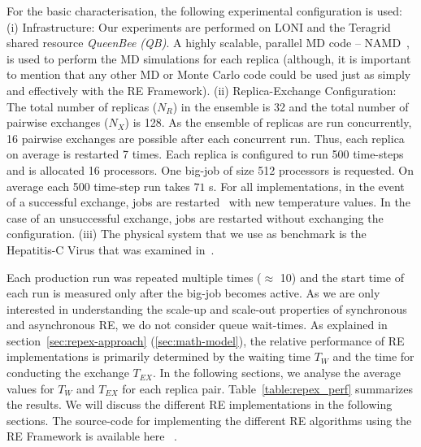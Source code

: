 \documentclass{rspublic}
\newcommand{\jhanote}[1]{ {\textcolor{red} { ***shantenu: #1 }}}
\newcommand{\alnote}[1]{ {\textcolor{blue} { ***andre: #1 }}}
\newcommand{\athotanote}[1]{ {\textcolor{green} { ***athota: #1 }}}
\newcommand{\alnote}[1]{}
\newcommand{\athotanote}[1]{}
\newcommand{\jhanote}[1]{}
\begin{document}
For the basic characterisation, the following experimental
configuration is used: (i) Infrastructure: Our experiments are
performed on LONI and the Teragrid shared resource \emph{QueenBee (QB)}. A
highly scalable, parallel MD code -- NAMD~\citep{Phillips:2005gd}, is
used to perform the MD simulations for each replica (although, it
is important to mention that any other MD or Monte Carlo code could be
used just as simply and effectively with the RE Framework).  (ii)
Replica-Exchange Configuration: The total number of replicas ($N_R$)
in the ensemble is 32 and the total number of pairwise exchanges
($N_X$) is 128. As the ensemble of replicas are run concurrently, 16
pairwise exchanges are possible after each concurrent run. Thus, each
replica on average is restarted 7 times.  Each replica is configured
to run 500 time-steps and is allocated 16 processors. One big-job of
size 512 processors is requested. On average each 500 time-step run
takes $71$ s.  For all implementations, in the event of a
successful exchange, jobs are restarted~\citep{Luckow:2008fp} with new
temperature values.  In the case of an unsuccessful exchange, jobs are
restarted without exchanging the configuration.  (iii) The physical
system that we use as benchmark is the Hepatitis-C Virus that was
examined in~\cite{Luckow:2008fp}.



Each production run was repeated multiple times  ($\approx$ 10) %
and the start time of each run is measured only after the big-job
becomes active.  As we are only interested in understanding the
scale-up and scale-out properties of synchronous and asynchronous RE,
we do not consider queue wait-times.  As explained in
section~\ref{sec:repex-approach} (\ref{sec:math-model}), the relative
performance of RE implementations is primarily determined by the
waiting time $T_W$ and the time for conducting the exchange
$T_{EX}$. In the following sections, we analyse the average values for $T_{W}$
and $T_{EX}$ for each replica pair.  Table~\ref{table:repex_perf}
summarizes the results. We will discuss the different RE
implementations in the following sections.  The source-code for
implementing the different RE algorithms using the RE Framework is
available here ~\citep{async-re_url}.  %
\end{document}
